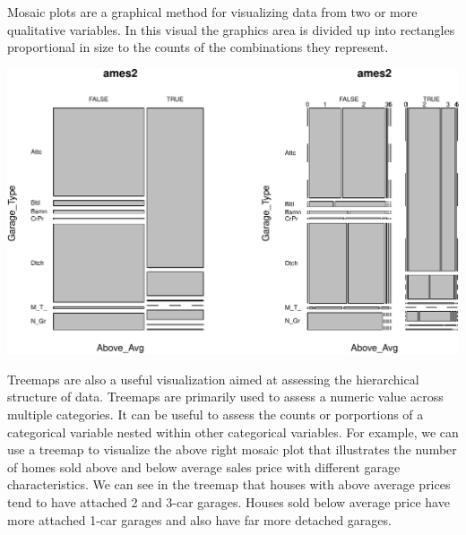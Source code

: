 \documentclass[]{article}
\newenvironment{Shaded}{\begin{snugshade}}{\end{snugshade}}
\newcommand{\KeywordTok}[1]{\textcolor[rgb]{0.13,0.29,0.53}{\textbf{#1}}}
\newcommand{\DataTypeTok}[1]{\textcolor[rgb]{0.13,0.29,0.53}{#1}}
\newcommand{\DecValTok}[1]{\textcolor[rgb]{0.00,0.00,0.81}{#1}}
\newcommand{\StringTok}[1]{\textcolor[rgb]{0.31,0.60,0.02}{#1}}
\newcommand{\OperatorTok}[1]{\textcolor[rgb]{0.81,0.36,0.00}{\textbf{#1}}}
\newcommand{\NormalTok}[1]{#1}
\begin{document}
Mosaic plots are a graphical method for visualizing data from two or
more qualitative variables. In this visual the graphics area is divided
up into rectangles proportional in size to the counts of the
combinations they represent.

\begin{Shaded}
\end{Shaded}

\begin{center}\includegraphics{Chapter_3_-_Visualization_files/figure-latex/mosaic-1} \end{center}

Treemaps are also a useful visualization aimed at assessing the
hierarchical structure of data. Treemaps are primarily used to assess a
numeric value across multiple categories. It can be useful to assess the
counts or porportions of a categorical variable nested within other
categorical variables. For example, we can use a treemap to visualize
the above right mosaic plot that illustrates the number of homes sold
above and below average sales price with different garage
characteristics. We can see in the treemap that houses with above
average prices tend to have attached 2 and 3-car garages. Houses sold
below average price have more attached 1-car garages and also have far
more detached garages.
\end{document}
